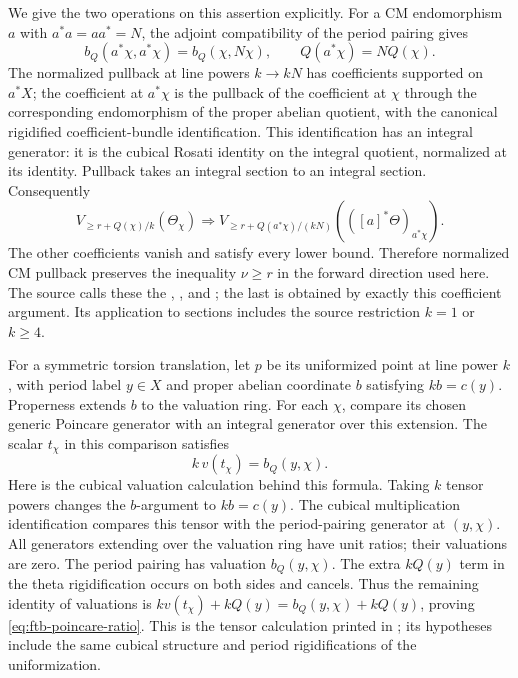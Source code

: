 We give the two operations on this assertion explicitly.
For a CM endomorphism \(a\) with \(a^*a=aa^*=N\), the adjoint
compatibility of the period pairing gives
\[
 b_Q(a^*\chi,a^*\chi)=b_Q(\chi,N\chi),\qquad
                         Q(a^*\chi)=NQ(\chi).
\]
The normalized pullback at line powers \(k\to kN\) has coefficients
supported on \(a^*X\); the coefficient at \(a^*\chi\) is the
pullback of the coefficient at \(\chi\) through the corresponding
endomorphism of the proper abelian quotient, with the canonical
rigidified coefficient-bundle identification.
This identification has an integral generator: it is the cubical
Rosati identity on the integral quotient, normalized at its identity.
Pullback takes an integral section to an integral section.
Consequently
\[
 V_{\ge r+Q(\chi)/k}(\Theta_\chi)
 \Longrightarrow
 V_{\ge r+Q(a^*\chi)/(kN)}
                       (([a]^*\Theta)_{a^*\chi}).
\]
The other coefficients vanish and satisfy every lower bound.
Therefore normalized CM pullback preserves the inequality \(\nu\ge r\)
in the forward direction used here.
The source calls these the
, , and
;
the last is obtained by exactly this coefficient argument.
Its application to sections includes the source restriction
\(k=1\) or \(k\ge4\).

For a symmetric torsion translation, let \(p\) be its uniformized
point at line power \(k\), with period label \(y\in X\) and proper
abelian coordinate \(b\) satisfying \(kb=c(y)\).
Properness extends \(b\) to the valuation ring.
For each \(\chi\), compare its chosen generic Poincare generator with
an integral generator over this extension.
The scalar \(t_\chi\) in this comparison satisfies
\begin{equation}\label{eq:ftb-poincare-ratio}
                     k\,v(t_\chi)=b_Q(y,\chi).
\end{equation}
Here is the cubical valuation calculation behind this formula.
Taking \(k\) tensor powers changes the \(b\)-argument to \(kb=c(y)\).
The cubical multiplication identification compares this tensor with
the period-pairing generator at \((y,\chi)\).
All generators extending over the valuation ring have unit ratios;
their valuations are zero.  The period pairing has valuation
\(b_Q(y,\chi)\).
The extra \(kQ(y)\) term in the theta rigidification occurs on both
sides and cancels.  Thus the remaining identity of valuations is
\(kv(t_\chi)+kQ(y)=b_Q(y,\chi)+kQ(y)\), proving
\eqref{eq:ftb-poincare-ratio}.
This is the tensor calculation printed in
;
its hypotheses include the same cubical structure and period
rigidifications of the uniformization.

